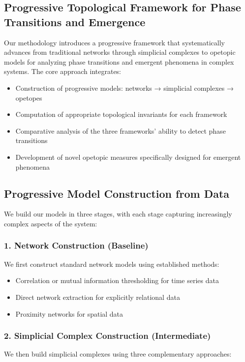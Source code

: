 \subsection{Progressive Topological Framework for Phase Transitions and Emergence}
Our methodology introduces a progressive framework that systematically advances from traditional networks through simplicial complexes to opetopic models for analyzing phase transitions and emergent phenomena in complex systems. The core approach integrates:

\begin{itemize}[leftmargin=*]
  \item Construction of progressive models: networks → simplicial complexes → opetopes
  \item Computation of appropriate topological invariants for each framework
  \item Comparative analysis of the three frameworks' ability to detect phase transitions
  \item Development of novel opetopic measures specifically designed for emergent phenomena
\end{itemize}

\subsection{Progressive Model Construction from Data}
We build our models in three stages, with each stage capturing increasingly complex aspects of the system:

\subsubsection{1. Network Construction (Baseline)}
We first construct standard network models using established methods:
\begin{itemize}
  \item Correlation or mutual information thresholding for time series data
  \item Direct network extraction for explicitly relational data
  \item Proximity networks for spatial data
\end{itemize}

\subsubsection{2. Simplicial Complex Construction (Intermediate)}
We then build simplicial complexes using three complementary approaches:

